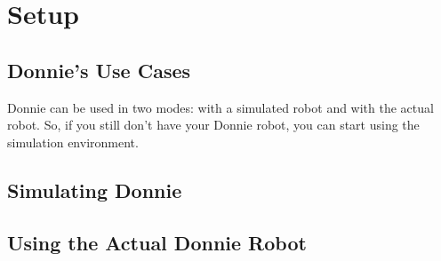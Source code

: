 \chapter{Setup}

\section{Donnie's Use Cases}
\label{sec:user_case}

Donnie can be used in two modes: with a simulated robot and with the actual robot.
So, if you still don’t have your Donnie robot, you can start using the simulation environment.


\section{Simulating Donnie}
\label{sec:sim}


\section{Using the Actual Donnie Robot}
\label{sec:robot}


